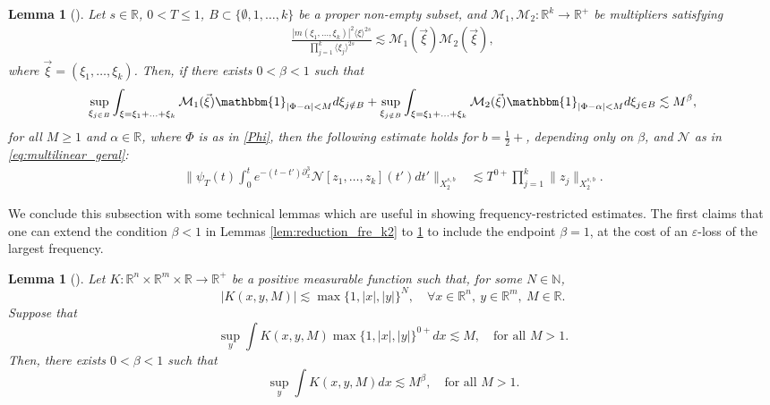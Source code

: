 \documentclass[a4paper,
11pt,  reqno]{amsart}
\newcommand{\jap}[1]{\langle #1 \rangle}
\newcommand{\5}{\textup{V}}
\newcommand{\les}{\lesssim}
\newcommand{\eps}{\varepsilon}
\newtheorem{lemma}[theorem]{Lemma}
\theoremstyle{remark}
\newcommand{\R}{\mathbb{R}}
\newcommand{\al}{\alpha}
\newcommand{\be}{\beta}
\newcommand{\M}{\mathcal{M}}
\numberwithin{equation}{section}
\numberwithin{theorem}{section}
\newcommand{\Ncal}{\mathcal{N}}
\begin{document}
		\begin{lemma}[{\cite[Lemma 2]{COS}}]\label{lem:fre_tri}
			Let $s\in\R$, $0<T\le 1$, $B\subset \{\emptyset, 1, \ldots, k\}$ be a proper non-empty subset, and  $\M_1 , \M_2: \R^{k} \to \R^+$ be multipliers satisfying
            \begin{align}
            \frac{|m(\xi_1, \ldots, \xi_k)|^2\jap{\xi}^{2s}}{\prod_{j=1}^k\jap{\xi_{j}}^{2s}}
            \les
                \M_1(\vec\xi) \M_2(\vec\xi)
                ,
            \end{align}
            where $\vec\xi=(\xi_1, \ldots, \xi_k)$.
            Then, if there exists $0<\be<1$ such that
			\begin{equation}\label{L2hypo}
			\sup_{\xi_{j\in B}} \int_{\xi=\xi_1+\ldots + \xi_k} \mathcal{M}_1 (\vec\xi) \mathbbm{1}_{|\Phi-\alpha|<M} d\xi_{j\notin B} + \sup_{\xi_{j\notin B}} \int_{\xi=\xi_1+\ldots+\xi_k} \mathcal{M}_2 (\vec\xi) \mathbbm{1}_{|\Phi-\alpha|<M} d\xi_{j\in B} \lesssim M^\beta,
			\end{equation}
            for all $M\ge 1$ and $\al\in\R$,
            where $\Phi$ is as in \eqref{Phi},
			then the following estimate holds for {$b=\frac12+$}, depending only on $\be$,
            and $\Ncal$ as in \eqref{eq:multilinear_geral}:
            \begin{align}
				\bigg\|\psi_T(t)\int_0^te^{-(t-t')\partial_x^3}\Ncal[z_1,\dots, z_k](t')dt' \bigg\|_{X^{s,b}_{2}} & \les T^{0+}\prod_{j=1}^k\|z_j\|_{X^{s,b}_{2}}.
			\end{align}
		\end{lemma}





		We conclude this subsection with some technical lemmas which are useful in showing frequency-restricted estimates.
        The first claims that one can extend the condition $\be<1$ in Lemmas \ref{lem:reduction_fre_k2} to \ref{lem:fre_tri} to include the endpoint $\be=1$, at the cost of an $\eps$-loss of the largest frequency.

		\begin{lemma}[{\cite[Lemma 3.3]{CLS}}]\label{lem:eta1}
			Let $K:\R^n\times \R^m\times \R\to \R^+$ be a positive measurable function such that, for some $N\in \mathbb{N}$,
			$$
			|K(x,y,M)|\lesssim \max\{1,|x|,|y|\}^N,\quad \forall x\in\R^n,\ y\in \R^m, \ M\in \R.
			$$
			Suppose that
			$$
			\sup_y \int K(x,y,M)\max\{1,|x|,|y|\}^{0+} dx \lesssim M,\quad \mbox{for all }M>1.
			$$
			Then, there exists $0<\beta<1$ such that
			$$
			\sup_y \int K(x,y,M) dx \lesssim M^{\beta},\quad \mbox{for all } M>1.
			$$
		\end{lemma}
\end{document}
